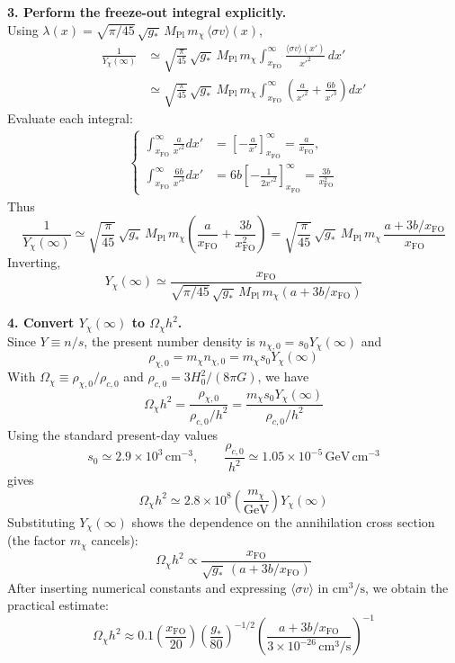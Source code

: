 \begin{foundation}
    \textbf{3. Perform the freeze-out integral explicitly.}\\
    Using $\lambda(x)=\sqrt{\pi/45}\,\sqrt{g_*}\,M_{\mathrm{Pl}}\,m_\chi\,\langle\sigma v\rangle(x)$,
    \begin{align*}
        \frac{1}{Y_\chi(\infty)}
        &\simeq \sqrt{\frac{\pi}{45}}\,\sqrt{g_*}\,M_{\mathrm{Pl}}\,m_\chi
        \int_{x_{\mathrm{FO}}}^{\infty}\frac{\langle\sigma v\rangle(x')}{x'^2}\,dx' \\
        &\simeq \sqrt{\frac{\pi}{45}}\,\sqrt{g_*}\,M_{\mathrm{Pl}}\,m_\chi
        \int_{x_{\mathrm{FO}}}^{\infty}\left(\frac{a}{x'^2}+\frac{6b}{x'^3}\right)dx'
    \end{align*}
    Evaluate each integral:
    \begin{align*}
        \begin{cases}
            \int_{x_{\mathrm{FO}}}^{\infty}\frac{a}{x'^2}dx' &= \left[-\frac{a}{x'}\right]_{x_{\mathrm{FO}}}^{\infty}=\frac{a}{x_{\mathrm{FO}}}, \\
            \int_{x_{\mathrm{FO}}}^{\infty}\frac{6b}{x'^3}dx' &= 6b\left[-\frac{1}{2x'^2}\right]_{x_{\mathrm{FO}}}^{\infty}=\frac{3b}{x_{\mathrm{FO}}^2}
        \end{cases}
    \end{align*}
    Thus
    \[
        \frac{1}{Y_\chi(\infty)}\simeq \sqrt{\frac{\pi}{45}}\,\sqrt{g_*}\,M_{\mathrm{Pl}}\,m_\chi\left(\frac{a}{x_{\mathrm{FO}}}+\frac{3b}{x_{\mathrm{FO}}^2}\right)
        = \sqrt{\frac{\pi}{45}}\,\sqrt{g_*}\,M_{\mathrm{Pl}}\,m_\chi\,\frac{a+3b/x_{\mathrm{FO}}}{x_{\mathrm{FO}}}
    \]
    Inverting,
    \[
        Y_\chi(\infty)\simeq \frac{x_{\mathrm{FO}}}{\sqrt{\pi/45}\,\sqrt{g_*}\,M_{\mathrm{Pl}}\,m_\chi\left(a+3b/x_{\mathrm{FO}}\right)}
    \]

    \textbf{4. Convert $Y_\chi(\infty)$ to $\Omega_\chi h^2$.}\\
    Since $Y\equiv n/s$, the present number density is $n_{\chi,0}=s_0 Y_\chi(\infty)$ and
    \[
        \rho_{\chi,0}=m_\chi n_{\chi,0}=m_\chi s_0 Y_\chi(\infty)
    \]
    With $\Omega_\chi\equiv \rho_{\chi,0}/\rho_{c,0}$ and $\rho_{c,0}=3H_0^2/(8\pi G)$, we have
    \[
        \Omega_\chi h^2 = \frac{\rho_{\chi,0}}{\rho_{c,0}/h^2} = \frac{m_\chi s_0 Y_\chi(\infty)}{\rho_{c,0}/h^2}
    \]
    Using the standard present-day values
    \[
        s_0\simeq 2.9\times10^3\,\mathrm{cm^{-3}},\qquad \frac{\rho_{c,0}}{h^2}\simeq 1.05\times10^{-5}\,\mathrm{GeV\,cm^{-3}}
    \]
    gives
    \[
        \Omega_\chi h^2\simeq 2.8\times10^8\left(\frac{m_\chi}{\mathrm{GeV}}\right)Y_\chi(\infty)
    \]
    Substituting $Y_\chi(\infty)$ shows the dependence on the annihilation cross section (the factor $m_\chi$ cancels):
    \[
        \Omega_\chi h^2 \propto \frac{x_{\mathrm{FO}}}{\sqrt{g_*}\,\left(a+3b/x_{\mathrm{FO}}\right)}
    \]
    After inserting numerical constants and expressing $\langle\sigma v\rangle$ in $\mathrm{cm^3/s}$, we obtain the practical estimate:
    \[
        \Omega_\chi h^2 \approx 0.1 \left( \frac{x_{\mathrm{FO}}}{20} \right) \left( \frac{g_*}{80} \right)^{-1/2} \left( \frac{a + 3b/x_{\mathrm{FO}}}{3 \times 10^{-26} \, \mathrm{cm}^3/\mathrm{s}} \right)^{-1}
    \]
\end{foundation}

